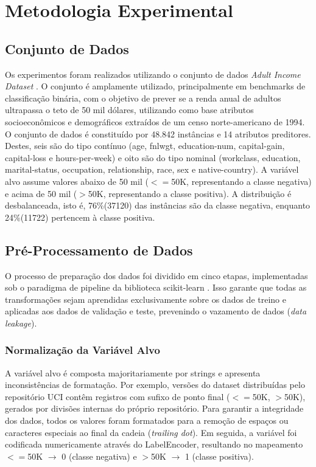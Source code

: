 \section{Metodologia Experimental}

\subsection{Conjunto de Dados}
Os experimentos foram realizados utilizando o conjunto de dados \textit{Adult Income Dataset} \cite{becker1996adult}. O conjunto é amplamente utilizado, principalmente em benchmarks de classificação binária, com o objetivo de prever se a renda anual de adultos ultrapassa o teto de 50 mil dólares, utilizando como base atributos socioeconômicos e demográficos extraídos de um censo norte-americano de 1994. O conjunto de dados é constituído por 48.842 instâncias e 14 atributos preditores. Destes, seis são do tipo contínuo (age, fnlwgt, education-num, capital-gain, capital-loss e hours-per-week) e oito são do tipo nominal (workclass, education, marital-status, occupation, relationship, race, sex e native-country). A variável alvo assume valores abaixo de 50 mil ($<=$50K, representando a classe negativa) e acima de 50 mil ($>$50K, representando a classe positiva). 
A distribuição é desbalanceada, isto é, 76\%(37120) das instâncias são da classe negativa, enquanto 24\%(11722) pertencem à classe positiva.

\subsection{Pré-Processamento de Dados}
O processo de preparação dos dados foi dividido em cinco etapas, implementadas sob o paradigma de pipeline da biblioteca scikit-learn \cite{scikit-learn}. Isso garante que todas as transformações sejam aprendidas exclusivamente sobre os dados de treino e aplicadas aos dados de validação e teste, prevenindo o vazamento de dados (\textit{data leakage}).

\subsubsection{Normalização da Variável Alvo}
A variável alvo é composta majoritariamente por strings e apresenta inconsistências de formatação. Por exemplo, versões do dataset distribuídas pelo repositório UCI contêm registros com sufixo de ponto final ($<=$50K, $>$50K), gerados por divisões internas do próprio repositório. Para garantir a integridade dos dados, todos os valores foram formatados para a remoção de espaços ou caracteres especiais ao final da cadeia (\textit{trailing dot}). Em seguida, a variável foi codificada numericamente através do LabelEncoder, resultando no mapeamento $<=$50K $\rightarrow$ 0 (classe negativa) e $>$50K $\rightarrow$ 1 (classe positiva).

